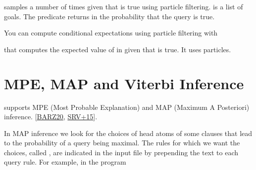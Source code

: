 \documentclass[letterpaper,10pt,english]{sphinxmanual}
\begin{document}
\sphinxAtStartPar
samples  a number of  times given that  is true using particle filtering.  is a list of goals.
The predicate returns in  the probability that the query is true.

\sphinxAtStartPar
You can compute conditional expectations using particle filtering with

\begin{sphinxVerbatim}[commandchars=\\\{\}]
  
\end{sphinxVerbatim}

\sphinxAtStartPar
that computes the expected value of  in  given that  is true.
It uses  particles.


\section{MPE, MAP and Viterbi Inference}
\label{\detokenize{index:mpe-map-and-viterbi-inference}}
\sphinxAtStartPar
{} supports MPE (Most Probable Explanation) and MAP (Maximum A Posteriori) inference. {[}\hyperlink{cite.index:id49}{BARZ20}, \hyperlink{cite.index:id48}{SRV+15}{]}.

\sphinxAtStartPar
In MAP inference we look for the choices of head atoms of some clauses that lead to the probability of a query being
maximal. The rules for which we want the choices, called , are indicated in the input file by prepending
the text  to each query rule. For example, in the program 
\end{document}
